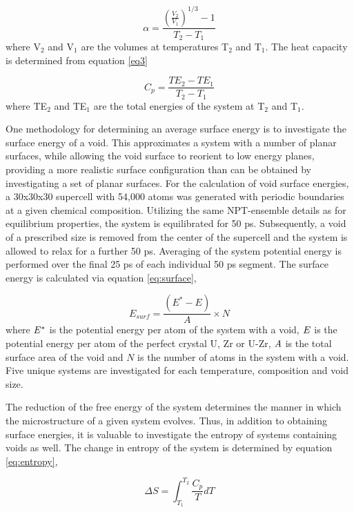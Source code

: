 \documentclass[review]{elsarticle}
\begin{document}
\begin{equation}
\label{eq2}
\alpha= \frac{(\frac{V_2}{V_1})^{1/3} - 1}{T_2-T_1}
\end{equation} where V$_2$ and V$_1$ are the volumes at temperatures T$_2$ and T$_1$. The heat capacity is determined from equation \ref{eq3}

\begin{equation}
\label{eq3}
C_p= \frac{TE_2 - TE_1}{T_2-T_1} 
\end{equation} where TE$_2$ and TE$_1$ are the total energies of the system at T$_2$ and T$_1$. 

One methodology for determining an average surface energy is to investigate the surface energy of a void. This approximates a system with a number of planar surfaces, while allowing the void surface to reorient to low energy planes, providing a more realistic surface configuration than can be obtained by investigating a set of planar surfaces. For the calculation of void surface energies, a 30x30x30 supercell with 54,000 atoms was generated with periodic boundaries at a given chemical composition. Utilizing the same NPT-ensemble details as for equilibrium properties, the system is equilibrated for 50 ps. Subsequently, a void of a prescribed size is removed from the center of the supercell and the system is allowed to relax for a further 50 ps. Averaging of the system potential energy is performed over the final 25 ps of each individual 50 ps segment. The surface energy is calculated via equation \ref{eq:surface},

\begin{equation}
\label{eq:surface}
E_{surf}= \frac{(E^{*} - E)}{A} \times N
\end{equation} where $\it{E^{*}}$ is the potential energy per atom of the system with a void, $\it{E}$ is the potential energy per atom of the perfect crystal U, Zr or U-Zr, $\it{A}$ is the total surface area of the void and $\textit{N}$ is the number of atoms in the system with a void. Five unique systems are investigated for each temperature, composition and void size.

The reduction of the free energy of the system determines the manner in which the microstructure of a given system evolves. Thus, in addition to obtaining surface energies, it is valuable to investigate the entropy of systems containing voids as well. The change in entropy of the system is determined by equation \ref{eq:entropy},

\begin{equation}
\label{eq:entropy}
\Delta S = \int_{T_{1}}^{T_{2}} \frac{C_{p}}{T} dT
\end{equation}
\end{document}
